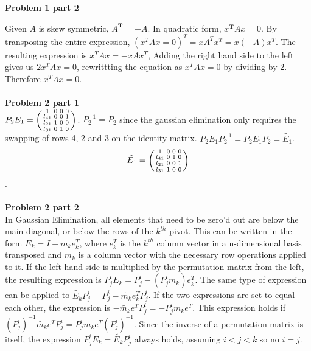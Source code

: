 \documentclass{report}
\begin{document}
\noindent \textbf{Problem 1 part 2}

Given $A$ is skew symmetric, $A^{\mathbf{T}}=-A$. In quadratic form, $x^{\mathbf{T}}Ax=0$.
By transposing the entire expression, $(x^TAx=0)^T=xA^Tx^T=x(-A)x^T$. The resulting expression is $x^TAx=-xAx^T$, Adding the right hand side to the left gives us $2x^TAx=0$, 
rewrittting the equation as $x^TAx=0$ by dividing by 2. Therefore $x^TAx=0$. \\\\

\noindent \textbf{Problem 2 part 1} \\

$P_2E_1 = \begin{psmallmatrix}  1 & 0 & 0 & 0 \\ l_{41} & 0 & 0 & 1 \\ l_{21} & 1 & 0 & 0 \\ l_{31} & 0 & 1 & 0   \end{psmallmatrix}$. 
$P_2^{-1}=P_2$ since the gaussian elimination only requires the swapping of rows 4, 2 and 3 on the identity matrix. $P_2E_1P_2^{-1} = P_2E_1P_2 = \tilde{E_1}$. \\

$$\tilde{E_1} = \begin{psmallmatrix} 1 & 0 & 0 & 0 \\ l_{41} & 0 & 1 & 0 \\ l_{21} & 0 & 0 & 1 \\ l_{31} & 1 & 0 & 0 \end{psmallmatrix}$$.\\\\



\noindent \textbf{Problem 2 part 2} \\

In Gaussian Elimination, all elements that need to be zero'd out are below the main diagonal, 
or below the rows of the $k^{th}$ pivot. This can be written in the form $E_k = I - m_ke^T_k$, where
$e_k^T$ is the $k^{th}$ column vector in a n-dimensional basis transposed and $m_k$ is a column vector with 
the necessary row operations applied to it. If the left hand side is multiplied by 
the permutation matrix from the left, the resulting expression is $P^i_jE_k = P^i_j - (P^i_jm_k)e^T_k$.
The same type of expression can be applied to $\tilde{E_k}P^i_j=P^i_j - \tilde{m_k}e^T_kP^i_j$. If the two
expressions are set to equal each other, the expression is $-\tilde{m_k}e^TP^i_j =-P^i_jm_ke^T$. This expression
holds if $(P^i_j)^{-1}\tilde{m_k}e^TP^i_j = P^i_jm_ke^T(P^i_j)^{-1}$. Since the inverse of a permutation matrix
is itself, the expression $P^i_jE_k=\tilde{E_k}P^i_j$ always holds, assuming $i<j<k$ so no $i=j$. 
\end{document}
